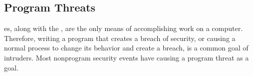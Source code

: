 \subsection{Program Threats}\label{subsec:Program_Threats}
es, along with the , are the only means of accomplishing work on a computer.
Therefore, writing a program that creates a breach of security, or causing a normal process to change its behavior and create a breach, is a common goal of intruders.
Most nonprogram security events have causing a program threat as a goal.


